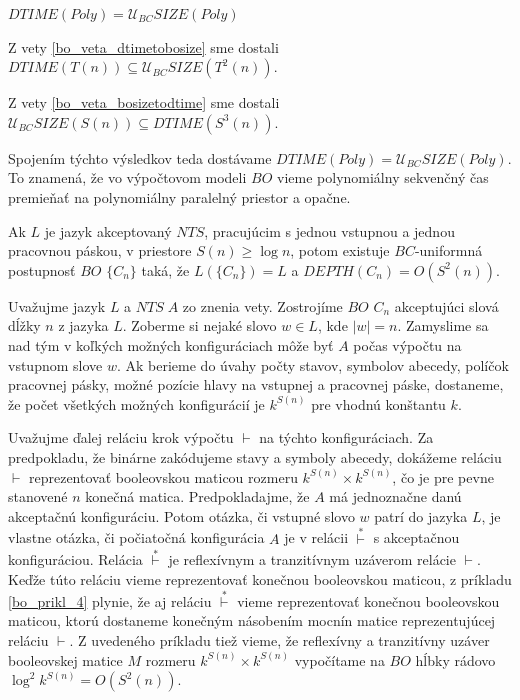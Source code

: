 {\begin{dosledok}
$DTIME(Poly)=\mathcal{U}_{BC} SIZE(Poly)$
\end{dosledok}

\begin{dokaz}
Z vety \ref{bo_veta_dtimetobosize} sme dostali
$DTIME(T(n))\subseteq\mathcal{U}_{BC} SIZE(T^2(n))$.

Z vety \ref{bo_veta_bosizetodtime} sme dostali $\mathcal{U}_{BC}
SIZE(S(n))\subseteq DTIME(S^3(n))$.

Spojením týchto výsledkov teda dostávame
$DTIME(Poly)=\mathcal{U}_{BC} SIZE(Poly)$. To znamená, že vo
výpočtovom modeli $BO$ vieme polynomiálny sekvenčný čas premieňať
na polynomiálny paralelný priestor a opačne.
\end{dokaz}

\begin{veta}
\label{bo_veta_nspacetobodepth}

Ak $L$ je jazyk akceptovaný $NTS$, pracujúcim s jednou vstupnou a
jednou pracovnou páskou, v priestore $S(n)\geq\log n$, potom
existuje $BC$-uniformná postupnosť $BO$ $\{ C_n\}$ taká, že $L(\{
C_n\})=L$ a $DEPTH(C_n)=O(S^2(n))$.
\end{veta}

\begin{dokaz}
Uvažujme jazyk $L$ a $NTS\; A$ zo znenia vety. Zostrojíme $BO$
$C_n$ akceptujúci slová dĺžky $n$ z jazyka $L$. Zoberme si nejaké
slovo $w\in L$, kde $|w|=n$. Zamyslime sa nad tým v koľkých
možných konfiguráciach môže byť $A$ počas výpočtu na vstupnom
slove $w$. Ak berieme do úvahy počty stavov, symbolov abecedy,
políčok pracovnej pásky, možné pozície hlavy na vstupnej a
pracovnej páske, dostaneme, že počet všetkých možných konfigurácií
je $k^{S(n)}$ pre vhodnú konštantu $k$.

Uvažujme ďalej reláciu krok výpočtu $\vdash$ na týchto
konfiguráciach. Za predpokladu, že binárne zakódujeme stavy a
symboly abecedy, dokážeme reláciu $\vdash$ reprezentovať
booleovskou maticou rozmeru $k^{S(n)}\times k^{S(n)}$, čo je pre
pevne stanovené $n$ konečná matica. Predpokladajme, že $A$ má
jednoznačne danú akceptačnú konfiguráciu. Potom otázka, či vstupné
slovo $w$ patrí do jazyka $L$, je vlastne otázka, či počiatočná
konfigurácia $A$ je v relácii $\overset{*}{\vdash}$ s akceptačnou
konfiguráciou. Relácia $\overset{*}{\vdash}$ je reflexívnym a
tranzitívnym uzáverom relácie $\vdash$. Keďže túto reláciu vieme
reprezentovať konečnou booleovskou maticou, z príkladu
\ref{bo_prikl_4} plynie, že aj reláciu $\overset{*}{\vdash}$ vieme
reprezentovať konečnou booleovskou maticou, ktorú dostaneme
konečným násobením mocnín matice reprezentujúcej reláciu $\vdash$.
Z uvedeného príkladu tiež vieme, že reflexívny a tranzitívny
uzáver booleovskej matice $M$ rozmeru $k^{S(n)}\times k^{S(n)}$
vypočítame na $BO$ hĺbky rádovo $\log^2 k^{S(n)}=O(S^2(n))$.


\end{dokaz}}
